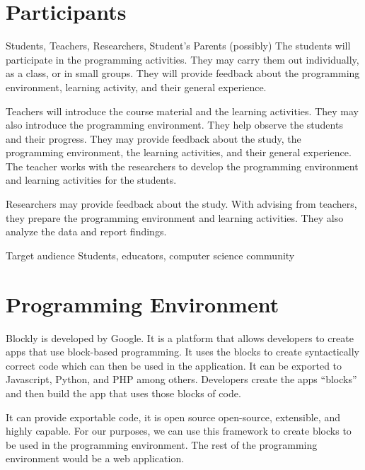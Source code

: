 \section*{Participants}
Students, Teachers, Researchers, Student's Parents (possibly)
The students will participate in the programming activities. They may carry them out individually, as a class, or in small groups. They will provide feedback about the programming environment, learning activity, and their general experience.

Teachers will introduce the course material and the learning activities. They may also introduce the programming environment. They help observe the students and their progress. They may provide feedback about the study, the programming environment, the learning activities, and their general experience. The teacher works with the researchers to develop the programming environment and learning activities for the students.

Researchers may provide feedback about the study. With advising from teachers, they prepare the programming environment and learning activities. They also analyze the data and report findings.

Target audience
Students, educators, computer science community

\section*{Programming Environment}
Blockly is developed by Google. It is a platform that allows developers to create apps that use block-based programming. It uses the blocks to create syntactically correct code which can then be used in the application. It can be exported to Javascript, Python, and PHP among others. Developers create the apps “blocks” and then build the app that uses those blocks of code. 

It can provide exportable code, it is open source open-source, extensible, and highly capable. For our purposes, we can use this framework to create blocks to be used in the programming environment. The rest of the programming environment would be a web application.

